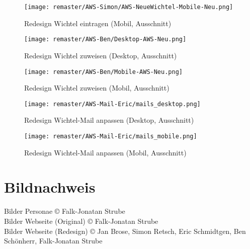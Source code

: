 \documentclass{scrreprt}
\begin{document}
\begin{figure}[!ht]
\centering
\texttt{[image: remaster/AWS-Simon/AWS-NeueWichtel-Mobile-Neu.png]}
\caption{Redesign Wichtel eintragen (Mobil, Ausschnitt)}
\end{figure}

\begin{figure}[!ht]
\centering
\texttt{[image: remaster/AWS-Ben/Desktop-AWS-Neu.png]}
\caption{Redesign Wichtel zuweisen (Desktop, Ausschnitt)}
\end{figure}

\begin{figure}[!ht]
\centering
\texttt{[image: remaster/AWS-Ben/Mobile-AWS-Neu.png]}
\caption{Redesign Wichtel zuweisen (Mobil, Ausschnitt)}
\end{figure}

\begin{figure}[!ht]
\centering
\texttt{[image: remaster/AWS-Mail-Eric/mails\_desktop.png]}
\caption{Redesign Wichtel-Mail anpassen (Desktop, Ausschnitt)}
\end{figure}

\begin{figure}[!ht]
\centering
\texttt{[image: remaster/AWS-Mail-Eric/mails\_mobile.png]}
\caption{Redesign Wichtel-Mail anpassen (Mobil, Ausschnitt)}
\end{figure}

\chapter{Bildnachweis}
Bilder Personae © Falk-Jonatan Strube\\
Bilder Webseite (Original) © Falk-Jonatan Strube\\
Bilder Webseite (Redesign) © Jan Brose, Simon Retsch, Eric Schmidtgen, Ben Schönherr, Falk-Jonatan Strube
\end{document}
